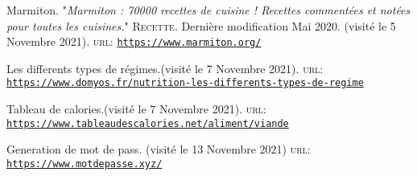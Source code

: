 \begin{thebibliography}{100}

\addtolength{\leftmargin}{0.2in}
\setlength{\itemindent}{-0.2in}

 Marmiton. "\emph{Marmiton : 70000 recettes de cuisine ! Recettes commentées et notées pour toutes les cuisines.}" \textsc{Recette}. Dernière modification Mai 2020. (visité le 5 Novembre 2021). \textsc{url:} \href{https://www.marmiton.org/}{\texttt{\url{https://www.marmiton.org/}}}

 Les differents types de régimes.(visité le 7 Novembre 2021). \textsc{url:} \href{https://www.domyos.fr/nutrition-les-differents-types-de-regime}{\texttt{\url{https://www.domyos.fr/nutrition-les-differents-types-de-regime}}}


 Tableau de calories.(visité le 7 Novembre 2021). \textsc{url:} \href{https://www.tableaudescalories.net/aliment/viande}{\texttt{\url{https://www.tableaudescalories.net/aliment/viande}}}

 Generation de mot de pass. (visité le 13 Novembre 2021) \textsc{url:} \href{https://www.motdepasse.xyz/}{\texttt{\url{https://www.motdepasse.xyz/}}}

\end{thebibliography}